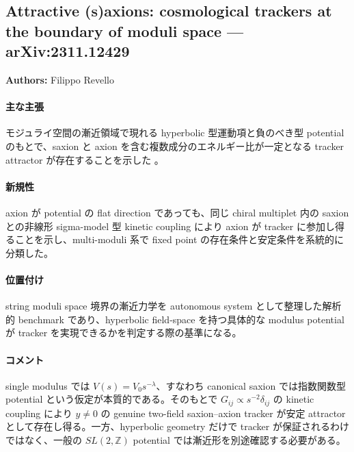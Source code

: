 \subsection{Attractive (s)axions: cosmological trackers at the boundary of moduli space --- arXiv:2311.12429}

\textbf{Authors:} Filippo Revello

\paragraph{主な主張}
モジュライ空間の漸近領域で現れる hyperbolic 型運動項と負のべき型 potential のもとで、saxion と axion を含む複数成分のエネルギー比が一定となる tracker attractor が存在することを示した \cite{Revello:2023saxions}。

\paragraph{新規性}
axion が potential の flat direction であっても、同じ chiral multiplet 内の saxion との非線形 sigma-model 型 kinetic coupling により axion が tracker に参加し得ることを示し、multi-moduli 系で fixed point の存在条件と安定条件を系統的に分類した。

\paragraph{位置付け}
string moduli space 境界の漸近力学を autonomous system として整理した解析的 benchmark であり、hyperbolic field-space を持つ具体的な modulus potential が tracker を実現できるかを判定する際の基準になる。

\paragraph{コメント}
single modulus では $V(s)=V_0 s^{-\lambda}$、すなわち canonical saxion では指数関数型 potential という仮定が本質的である。そのもとで $G_{ij}\propto s^{-2}\delta_{ij}$ の kinetic coupling により $y\neq0$ の genuine two-field saxion--axion tracker が安定 attractor として存在し得る。一方、hyperbolic geometry だけで tracker が保証されるわけではなく、一般の $SL(2,\mathbb{Z})$ potential では漸近形を別途確認する必要がある。
